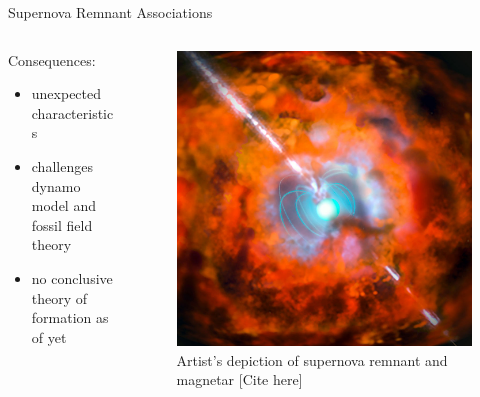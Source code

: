 \documentclass[hyperref=pdftex, presentation]{beamer}
\begin{document}
\begin{frame}{\Large Supernova Remnant Associations}
\begin{minipage}[0.2\textheight]{\textwidth}
\begin{columns}[T]
\begin{column}{0.5\textwidth}
\begin{block}{Consequences:}
					\begin{itemize}
					 \item<5-> unexpected characteristics  %
					 \item<6-> challenges dynamo model and fossil field theory
					 \item<7-> no conclusive theory of formation as of yet %
					\end{itemize}
				\end{block}
			\end{column}
			\begin{column}{0.5\textwidth}
				\begin{figure}
					\includegraphics[scale=.15]{figures/magnetar_sn_remnant.jpg}
					\caption{Artist's depiction of supernova remnant and magnetar [Cite here]}
				\end{figure}
			\end{column}
		\end{columns}
	\end{minipage}

\end{frame}

\end{document}
